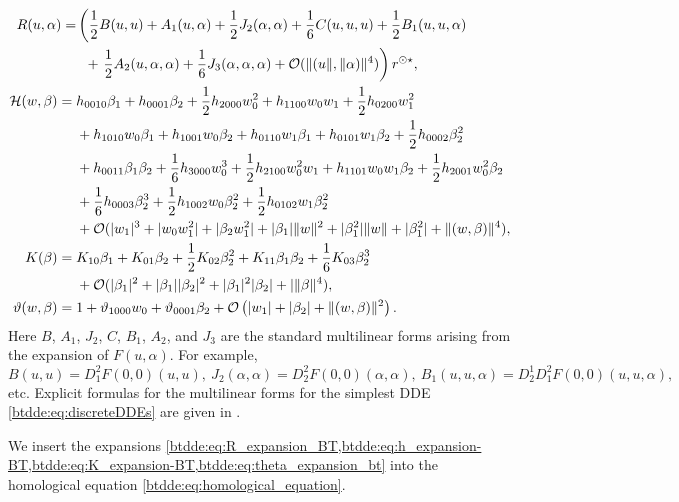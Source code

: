 \begin{align}
R(u,\alpha) = & \label{btdde:eq:R_expansion_BT}
    \left(\frac{1}{2} B(u,u) + A_1(u,\alpha) + \frac{1}{2} J_2(\alpha,\alpha) + \frac{1}{6} C(u,u,u) 
    + \frac{1}{2} B_1(u,u,\alpha) \right. \\
    &\phantom{\Bigl(}+ \left. \frac{1}{2} A_2(u,\alpha,\alpha) + \frac{1}{6} J_3(\alpha,\alpha,\alpha) 
    + \mathcal O(\|(u\|,\|\alpha)\|^4) \right) r^{\odot\star} , \nonumber \\
\mathcal H(w,\beta) = {}& \label{btdde:eq:h_expansion-BT}
    h_{0010}\beta_1 + h_{0001} \beta_2 
    + \frac12 h_{2000}w_0^2 + h_{1100}w_0w_1 + \frac12 h_{0200}w_1^2 \\
    & + h_{1010}w_0\beta_1 + h_{1001}w_0\beta_2 + h_{0110}w_1\beta_1 
    + h_{0101}w_1\beta_2 + \frac12 h_{0002}\beta_2^2\nonumber \\
    & + h_{0011}\beta_1\beta_2 + \frac16 h_{3000}w_0^3 + \frac12 h_{2100}w_0^2w_1 
    + h_{1101}w_0w_1\beta_2 + \frac12 h_{2001}w_0^2\beta_2\nonumber \\
    & + \frac{1}{6}h_{0003}\beta_2^3 + \frac12 h_{1002}w_0\beta_2^2 
    + \frac12 h_{0102}w_1\beta_2^2 \nonumber \\
    & + \mathcal{O}(|w_1|^3 + |w_0w_1^2| + |\beta_2w_1^2| + |\beta_1|\|w\|^2
    +|\beta_1^2|\|w\| + |\beta_1^2| + \|(w,\beta)\|^4), \nonumber \\
K(\beta) = {}& \label{btdde:eq:K_expansion-BT}
    K_{10}\beta_1 + K_{01}\beta_2 + \frac{1}{2}K_{02}\beta_2^{2} 
	+ K_{11}\beta_1\beta_2 + \frac16 K_{03} \beta_2^3 \\
    &+ \mathcal{O}(|\beta_1|^2 + |\beta_1||\beta_2|^2 + |\beta_1|^2|\beta_2|  
	+ |\|\beta\|^4), \nonumber \\
\vartheta(w,\beta) = {}& \label{btdde:eq:theta_expansion_bt}
    1 + \vartheta_{1000}w_0 + \vartheta_{0001} \beta_2 
    + \mathcal O\left(|w_1| + |\beta_2| + \|(w,\beta)\|^2\right).
\end{align}
%
Here $B$, $A_1$, $J_2$, $C$, $B_1$, $A_2$, and $J_3$ are the standard
multilinear forms arising from the expansion of $F(u,\alpha)$. For example,
\[
B(u,u) = D^2_1F(0,0)(u,u),~J_2(\alpha,\alpha) = D_2^2F(0,0)(\alpha,\alpha),~B_1(u,u,\alpha) = D^1_2D^2_1F(0,0)(u,u,\alpha),
\]
etc. Explicit formulas for the multilinear forms for the simplest DDE
\cref{btdde:eq:discreteDDEs} are given in \cite[Section 6]{Switching2019}.

We insert the expansions
\cref{btdde:eq:R_expansion_BT,btdde:eq:h_expansion-BT,btdde:eq:K_expansion-BT,btdde:eq:theta_expansion_bt}
into the homological equation \cref{btdde:eq:homological_equation}. 

